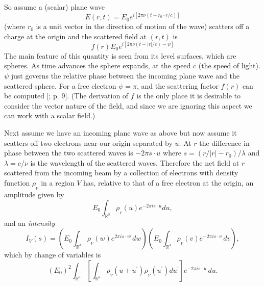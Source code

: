 \documentclass[reqno]{stml-l}
\theoremstyle{plain}
\theoremstyle{definition}
\numberwithin{equation}{chapter}
\begin{document}
So assume a (scalar) plane wave
\begin{equation}
E(r, t)=E_{0}e^{i[2\pi\nu(t-r_{0}\cdot r/c)]}\label{ch02:eqn2.3}
\end{equation}
(where $r_{0}$ is a unit vector in the direction of motion of the wave) scatters off a charge at the origin and the scattered field at $(r, t)$ is
\begin{equation}
f(r)E_{0}e^{i[2\pi\nu(t-|r|/c)-\psi]}\label{ch02:eqn2.4}
\end{equation}
The main feature of this quantity is seen from its level surfaces, which are spheres. As time advances the sphere expands, at the speed $c$ (the speed of light). $\psi$ just governs the relative phase between the incoming plane wave and the scattered sphere. For a free electron $\psi=\pi$, and the scattering factor $f(r)$ can be computed [; p. 9]. (The derivation of $f$ is the only place it is desirable to consider the vector nature of the field, and since we are ignoring this aspect we can work with a scalar field.)

Next assume we have an incoming plane wave as above but now assume it scatters off two electrons near our origin separated by $u$. At $r$ the difference in phase between the two scattered waves is $-2\pi s\cdot u$ where $s=(r/|r|-r_{0})/\lambda$ and $\lambda=c/\nu$ is the wavelength of the scattered waves. Therefore the net field at $r$ scattered from the incoming beam by a collection of electrons with density function $\rho_{_{V}}$ in a region $V$ has, relative to that of a free electron at the origin, an amplitude given by
\begin{equation}
E_{0}\int_{\mathbb{R}^{3}}\rho_{_{V}}(u)e^{-2\pi is\cdot u}du,\label{ch02:eqn2.5}
\end{equation}
and an \emph{intensity}
\begin{equation}
I_{V}(s)=(E_{0}\int_{\mathbb{R}^{3}}\rho_{_{V}}(w)e^{2\pi is\cdot w}\,dw)(E_{0}\int_{\mathbb{R}^{3}}\rho_{_{V}}(v)e^{-2\pi is\cdot v}\,dv),\label{ch02:eqn2.6}
\end{equation}
which by change of variables is
\begin{equation}
(E_{0})^{2}\int_{\mathbb{R}^{3}}[\int_{\mathbb{R}^{3}}\rho_{_{V}}(u+u^{\prime})\rho_{_{V}}(u^{\prime})du^{\prime}]e^{-2\pi is\cdot u}\,du.\label{ch02:eqn2.7}
\end{equation}
\end{document}
